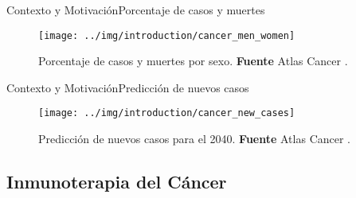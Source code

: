 \documentclass[10pt]{beamer}
\newcommand{\1}{
	\setbeamertemplate{background}{
		\texttt{[image: img/1]}
		\tikz[overlay] \fill[fill opacity=0.75,fill=white] (0,0) rectangle (-\paperwidth,\paperheight);
	}
}
\begin{document}
\begin{frame}{Contexto y Motivación}{Porcentaje de casos y muertes}
	\begin{figure}[]
		\centering
		\texttt{[image: ../img/introduction/cancer\_men\_women]}
		\caption{Porcentaje de casos y muertes por sexo. \textbf{Fuente} Atlas Cancer \cite{canceratlas2023}.}
	\end{figure}
\end{frame}

\begin{frame}{Contexto y Motivación}{Predicción de nuevos casos}
	\begin{figure}[]
		\centering
		\texttt{[image: ../img/introduction/cancer\_new\_cases]}
		\caption{Predicción de nuevos casos para el 2040. \textbf{Fuente} Atlas Cancer \cite{canceratlas2023}.}
	\end{figure}
\end{frame}

\subsection{Inmunoterapia del Cáncer}




\end{document}
